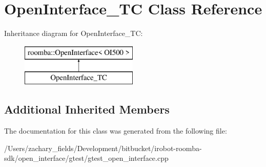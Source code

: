 \hypertarget{class_open_interface___t_c}{\section{Open\+Interface\+\_\+\+T\+C Class Reference}
\label{class_open_interface___t_c}
}
Inheritance diagram for Open\+Interface\+\_\+\+T\+C\+:\begin{figure}[H]
\begin{center}
\leavevmode
\includegraphics[height=2.000000cm]{class_open_interface___t_c}
\end{center}
\end{figure}
\subsection*{Additional Inherited Members}


The documentation for this class was generated from the following file\+:\begin{DoxyCompactItemize}
\item 
/\+Users/zachary\+\_\+fields/\+Development/bitbucket/irobot-\/roomba-\/sdk/open\+\_\+interface/gtest/gtest\+\_\+open\+\_\+interface.\+cpp\end{DoxyCompactItemize}
